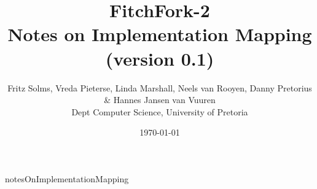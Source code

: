 \documentclass[titlepage]{article}
\title{FitchFork-2 \\ Notes on Implementation Mapping
          (version 0.1)}
\author{Fritz Solms, Vreda Pieterse, Linda Marshall, Neels van Rooyen, Danny Pretorius \& Hannes Jansen van Vuuren \\ Dept Computer Science, University of Pretoria}
\date{\today}
\begin{document}
\maketitle

\tableofcontents

\newpage

{notesOnImplementationMapping}
\end{document}

